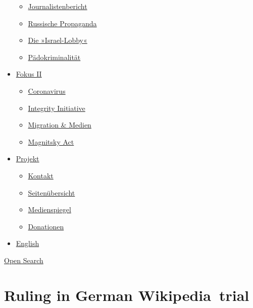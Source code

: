 \begin{itemize}
  \begin{itemize}
  \tightlist
  \item
    \href{https://swprs.org/bericht-eines-journalisten/}{Journalistenbericht}
  \item
    \href{https://swprs.org/russische-propaganda/}{Russische Propaganda}
  \item
    \href{https://swprs.org/die-israel-lobby-fakten-und-mythen/}{Die
    »Israel-Lobby«}
  \item
    \href{https://swprs.org/geopolitik-und-paedokriminalitaet/}{Pädokriminalität}
  \end{itemize}
\item
  \href{https://swprs.org/migration-und-medien/}{Fokus II}

  \begin{itemize}
  \tightlist
  \item
    \href{https://swprs.org/covid-19-hinweis-ii/}{Coronavirus}
  \item
    \href{https://swprs.org/die-integrity-initiative/}{Integrity
    Initiative}
  \item
    \href{https://swprs.org/migration-und-medien/}{Migration \& Medien}
  \item
    \href{https://swprs.org/der-fall-magnitsky/}{Magnitsky Act}
  \end{itemize}
\item
  \href{https://swprs.org/kontakt/}{Projekt}

  \begin{itemize}
  \tightlist
  \item
    \href{https://swprs.org/kontakt/}{Kontakt}
  \item
    \href{https://swprs.org/uebersicht/}{Seitenübersicht}
  \item
    \href{https://swprs.org/medienspiegel/}{Medienspiegel}
  \item
    \href{https://swprs.org/donationen/}{Donationen}
  \end{itemize}
\item
  \href{https://swprs.org/contact/}{English}
\end{itemize}

\protect\hyperlink{}{Open Search}

\hypertarget{ruling-in-german-wikipedia-trial}{%
\section{Ruling in German
Wikipedia~trial}\label{ruling-in-german-wikipedia-trial}}

